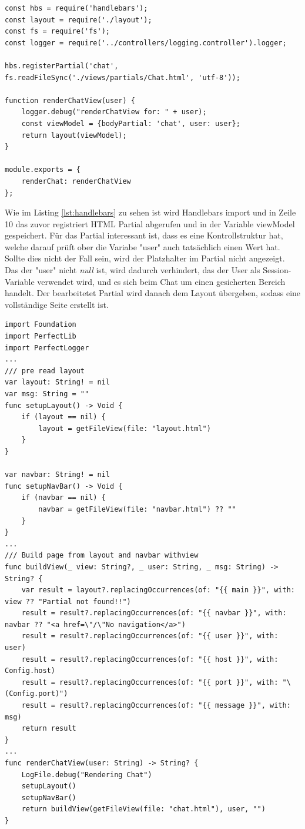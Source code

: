 \begin{lstlisting}
const hbs = require('handlebars');
const layout = require('./layout');
const fs = require('fs');
const logger = require('../controllers/logging.controller').logger;

hbs.registerPartial('chat', fs.readFileSync('./views/partials/Chat.html', 'utf-8'));

function renderChatView(user) {
    logger.debug("renderChatView for: " + user);
    const viewModel = {bodyPartial: 'chat', user: user};
    return layout(viewModel);
}

module.exports = {
    renderChat: renderChatView
};
\end{lstlisting}

Wie im Listing \ref{lst:handlebars} zu sehen ist wird Handlebars import und in Zeile 10 das zuvor registriert HTML Partial abgerufen und in der Variable viewModel gespeichert. Für das Partial interessant ist, dass es eine Kontrollstruktur hat, welche darauf prüft ober die Variabe "user" auch tatsächlich einen Wert hat. Sollte dies nicht der Fall sein, wird der Platzhalter im Partial nicht angezeigt. Das der "user" nicht \textit{null} ist, wird dadurch verhindert, das der User als Session-Variable verwendet wird, und es sich beim Chat um einen gesicherten Bereich handelt. Der bearbeitetet Partial wird danach dem Layout übergeben, sodass eine vollständige Seite erstellt ist. 



\begin{lstlisting}
import Foundation
import PerfectLib
import PerfectLogger
...
/// pre read layout
var layout: String! = nil
var msg: String = ""
func setupLayout() -> Void {
    if (layout == nil) {
        layout = getFileView(file: "layout.html")
    }
}

var navbar: String! = nil
func setupNavBar() -> Void {
    if (navbar == nil) {
        navbar = getFileView(file: "navbar.html") ?? ""
    }
}
...
/// Build page from layout and navbar withview
func buildView(_ view: String?, _ user: String, _ msg: String) -> String? {
    var result = layout?.replacingOccurrences(of: "{{ main }}", with: view ?? "Partial not found!!")
    result = result?.replacingOccurrences(of: "{{ navbar }}", with: navbar ?? "<a href=\"/\"No navigation</a>")
    result = result?.replacingOccurrences(of: "{{ user }}", with: user)
    result = result?.replacingOccurrences(of: "{{ host }}", with: Config.host)
    result = result?.replacingOccurrences(of: "{{ port }}", with: "\(Config.port)")
    result = result?.replacingOccurrences(of: "{{ message }}", with: msg)
    return result
}
...
func renderChatView(user: String) -> String? {
    LogFile.debug("Rendering Chat")
    setupLayout()
    setupNavBar()
    return buildView(getFileView(file: "chat.html"), user, "")
}
\end{lstlisting}

